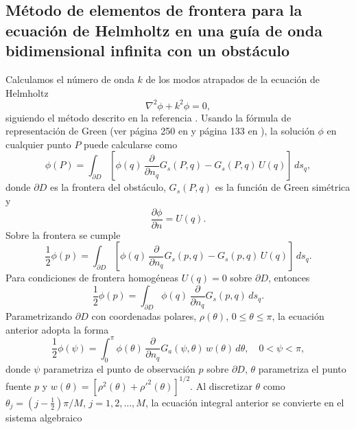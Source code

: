 \documentclass[11pt]{article}
\begin{document}
\subsection{Método de elementos de frontera para la ecuación de Helmholtz en una guía de onda bidimensional infinita con un obstáculo}
Calculamos el número de onda $k$ de los modos atrapados de la ecuación de Helmholtz
\begin{equation}
  \label{eq:16}
  \nabla^2\phi + k^2\phi = 0,
\end{equation}
siguiendo el método descrito en la referencia \cite{linton1992integral}. Usando la fórmula de representación de Green (ver página 250 en \cite{olver2014introduction} y página 133 en \cite{newman2018marine}), la solución $\phi$ en cualquier punto $P$ puede calcularse como
\begin{equation}
  \label{eq:18}
\phi(P) = \int_{\partial D} \left[ \phi(q)\, 
\frac{\partial}{\partial n_q} G_s(P,q) 
- G_s(P,q)\, U(q) \right] \, ds_q ,
\end{equation}
donde $\partial D$ es la frontera del obstáculo, $G_s(P,q)$ es la función de Green simétrica y 
\begin{equation}
  \label{eq:19}
  \frac{\partial\phi}{\partial n} = U(q).
\end{equation}
Sobre la frontera se cumple
\begin{equation}
  \label{eq:20}
  \frac{1}{2}\phi(p) = \int_{\partial D} \left[ \phi(q)\, 
\frac{\partial}{\partial n_q} G_s(p,q) 
- G_s(p,q)\, U(q) \right] \, ds_q.
\end{equation}
Para condiciones de frontera homogéneas $U(q)=0$ sobre $\partial D$, entonces
\begin{equation}
  \label{eq:21}
  \frac{1}{2}\phi(p) = \int_{\partial D} \phi(q)\, 
\frac{\partial}{\partial n_q} G_s(p,q)  \, ds_q.  
\end{equation}
Parametrizando $\partial D$ con coordenadas polares, $\rho(\theta)$, $0 \le \theta \le \pi$, la ecuación anterior adopta la forma
\begin{equation}
  \label{eq:22}
  \frac{1}{2}\phi(\psi) = \int_{0}^{\pi} 
\phi(\theta) \, \frac{\partial}{\partial n_q} 
G_a(\psi,\theta)\, w(\theta) \, d\theta, 
\quad 0 < \psi < \pi ,
\end{equation}
donde $\psi$ parametriza el punto de observación $p$ sobre $\partial D$, $\theta$ parametriza el punto fuente $p$ y $w(\theta) = [\rho^2(\theta) + \rho'^2(\theta)]^{1/2}$. Al discretizar $\theta$ como $\theta_j = (j-\frac{1}{2})\pi/M$, $j=1,2,\ldots,M$, la ecuación integral anterior se convierte en el sistema algebraico
\end{document}

